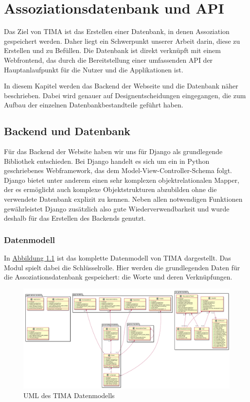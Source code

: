 \chapter{Assoziationsdatenbank und API}
Das Ziel von TIMA ist das Erstellen einer Datenbank, in denen Assoziation gespeichert werden. Daher liegt ein Schwerpunkt unserer Arbeit darin, diese zu Erstellen und zu Befüllen. Die Datenbank ist direkt verknüpft mit einem Webfrontend, das durch die Bereitstellung einer umfassenden API der Hauptanlaufpunkt für die Nutzer und die Applikationen ist.

In diesem Kapitel werden das Backend der Webseite und die Datenbank näher beschrieben. Dabei wird genauer auf Designentscheidungen eingegangen, die zum Aufbau der einzelnen Datenbankbestandteile geführt haben.

\section{Backend und Datenbank}
Für das Backend der Website haben wir uns für Django als grundlegende Bibliothek entschieden. Bei Django handelt es sich um ein in Python geschriebenes Webframework, das dem Model-View-Controller-Schema folgt. Django bietet unter anderem einen sehr komplexen objektrelationalen Mapper, der es ermöglicht auch komplexe Objektstrukturen abzubilden ohne die verwendete Datenbank explizit zu kennen. Neben allen notwendigen Funktionen gewährleistet Django zusätzlich also gute Wiederverwendbarkeit und wurde deshalb für das Erstellen des Backends genutzt.

\subsection{Datenmodell}
In \hyperref[fig:uml]{Abbildung \ref*{fig:uml}} ist das komplette Datenmodell von TIMA dargestellt. Das Modul  spielt dabei die Schlüsselrolle. Hier werden die grundlegenden Daten für die Assoziationsdatenbank gespeichert: die Worte und deren Verknüpfungen.

\begin{figure}
	\centering
	\includegraphics[width=\textwidth]{images/uml.png}
	\caption{UML des TIMA Datenmodells}
	\label{fig:uml}
\end{figure}

